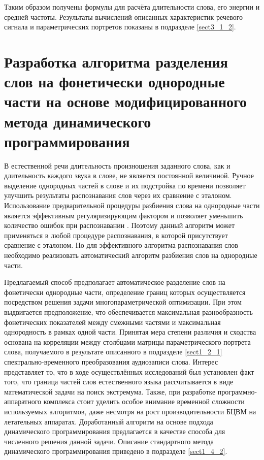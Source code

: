 Таким образом получены формулы для расчёта длительности слова, его энергии и средней частоты.
Результаты вычислений описанных характеристик речевого сигнала и параметрических портретов показаны в подразделе \ref{sect3_1_2}.


\section{Разработка алгоритма разделения слов на фонетически однородные части на основе модифицированного метода динамического программирования} \label{sect2_2}

В естественной речи длительность произношения заданного слова, как и длительность каждого звука в слове, не является постоянной величиной.
Ручное выделение однородных частей в слове и их подстройка по времени позволяет улучшить результаты распознавания слов через их сравнение с эталоном.
Использование предварительной процедуры разбиения слова на однородные части является эффективным регуляризирующим фактором и позволяет уменьшить количество ошибок при распознавании \cite{savchenko2014algorithm}.
Поэтому данный алгоритм может применяться в любой процедуре распознавания, в которой присутствует сравнение с эталоном.
Но для эффективного алгоритма распознавания слов необходимо реализовать автоматический алгоритм разбиения слов на однородные части.

Предлагаемый способ предполагает автоматическое разделение слов на фонетически однородные части, определение границ которых осуществляется посредством решения задачи многопараметрической оптимизации.
При этом выдвигается предположение, что обеспечивается максимальная разнообразность фонетических показателей между смежными частями и максимальная однородность в рамках одной части.
Принятая мера степени различия и сходства основана на корреляции между столбцами матрицы параметрического портрета слова, получаемого в результате описанного в подразделе \ref{sect1_2_1} спектрально-временного преобразования аудиозаписи слова.
Интерес представляет то, что в ходе осуществлённых исследований был установлен факт того, что граница частей слов естественного языка рассчитывается в виде математической задачи на поиск экстремума.
Также, при разработке программно-аппаратного комплекса стоит уделить особое внимание временной сложности используемых алгоритмов, даже несмотря на рост производительности БЦВМ на летательных аппаратах.
Доработанный алгоритм на основе подхода динамического программирования предлагается в качестве способа для численного решения данной задачи.
Описание стандартного метода динамического программирования приведено в подразделе \ref{sect1_4_2}.

